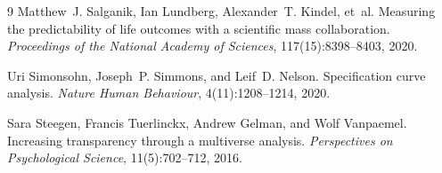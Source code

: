 \documentclass{article}
\begin{document}
\begin{thebibliography}{9}
Matthew~J. Salganik, Ian Lundberg, Alexander~T. Kindel, et~al.
\newblock Measuring the predictability of life outcomes with a scientific mass collaboration.
\newblock \emph{Proceedings of the National Academy of Sciences}, 117(15):8398--8403, 2020.

Uri Simonsohn, Joseph~P. Simmons, and Leif~D. Nelson.
\newblock Specification curve analysis.
\newblock \emph{Nature Human Behaviour}, 4(11):1208--1214, 2020.

Sara Steegen, Francis Tuerlinckx, Andrew Gelman, and Wolf Vanpaemel.
\newblock Increasing transparency through a multiverse analysis.
\newblock \emph{Perspectives on Psychological Science}, 11(5):702--712, 2016.

\end{thebibliography}


\end{document}
